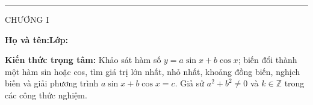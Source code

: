 \documentclass[11pt,a4paper]{article}
\begin{document}
\noindent
\begin{minipage}[t]{.35\linewidth}
 \vspace{2pt}\rule{.73\linewidth}{.4pt}\par\vspace{3pt}
 CHƯƠNG I\par\vspace{3pt}{\itshape TÀI LIỆU HỌC TẬP -- BÀI 05\par}
\end{minipage}\hfill
\begin{minipage}[t]{.62\linewidth}
 \vspace{4pt}{\small\bfseries BÀI 05. HÀM SỐ VÀ PHƯƠNG TRÌNH\par DẠNG $a\sin x+b\cos x$\par}
\end{minipage}

\vspace{5mm}
\noindent\textbf{Họ và tên:}\dotfill\hfill\textbf{Lớp:}\enspace\dotfill
\vspace{3mm}
\begin{theorybox}
\textbf{Kiến thức trọng tâm:} Khảo sát hàm số $y=a\sin x+b\cos x$;
biến đổi thành một hàm sin hoặc cos, tìm giá trị lớn nhất, nhỏ nhất,
khoảng đồng biến, nghịch biến và giải phương trình $a\sin x+b\cos x=c$.
Giả sử $a^2+b^2\ne0$ và $k\in\mathbb Z$ trong các công thức nghiệm.
\end{theorybox}
\end{document}
